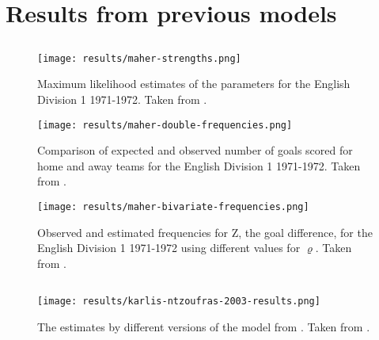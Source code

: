 \chapter{Results from previous models}

\section{\citet{bib:maher-1982}}

\begin{figure}[H]
    \centering
    \texttt{[image: results/maher-strengths.png]}
    \caption{Maximum likelihood estimates of the parameters for the English Division 1 1971-1972. Taken from \citet{bib:maher-1982}.}
    \label{fig:app-maher-strengths}
\end{figure}

\begin{figure}[H]
    \centering
    \texttt{[image: results/maher-double-frequencies.png]}
    \caption{Comparison of expected and observed number of goals scored for home and away teams for the English Division 1 1971-1972. Taken from \citet{bib:maher-1982}.}
    \label{fig:app-maher-double-frequencies}
\end{figure}

\begin{figure}[H]
    \centering
    \texttt{[image: results/maher-bivariate-frequencies.png]}
    \caption{Observed and estimated frequencies for Z, the goal difference, for the English Division 1 1971-1972 using different values for $\varrho$. Taken from \citet{bib:maher-1982}.}
    \label{fig:app-maher-bivariate-frequencies}
\end{figure}


\section{\citet{bib:karlis-ntzoufras-2003}}

\begin{figure}[H]
    \centering
    \texttt{[image: results/karlis-ntzoufras-2003-results.png]}
    \caption{The estimates by different versions of the model from \citet{bib:karlis-ntzoufras-2003}. Taken from \citet{bib:karlis-ntzoufras-2003}.}
    \label{fig:app-karlis-ntzoufras-2003-results}
\end{figure}


\section{\citet{bib:koopman-lit-2015}}

